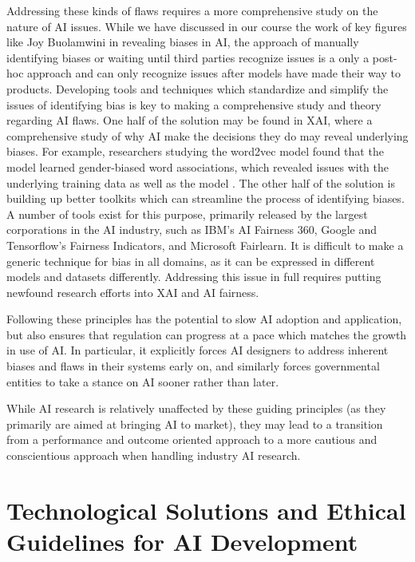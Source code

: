 \documentclass[10pt]{article}
\begin{document}
    Addressing these kinds of flaws requires a more comprehensive study on the nature of AI issues. While we have discussed in our course the work of key figures like Joy Buolamwini in revealing biases in AI, the approach of manually identifying biases or waiting until third parties recognize issues is a only a post-hoc approach and can only recognize issues after models have made their way to products. Developing tools and techniques which standardize and simplify the issues of identifying bias is key to making a comprehensive study and theory regarding AI flaws. One half of the solution may be found in XAI, where a comprehensive study of why AI make the decisions they do may reveal underlying biases. For example, researchers studying the word2vec model found that the model learned gender-biased word associations, which revealed issues with the underlying training data as well as the model \cite{bolukbasi2016man}. The other half of the solution is building up better toolkits which can streamline the process of identifying biases. A number of tools exist for this purpose, primarily released by the largest corporations in the AI industry, such as IBM’s AI Fairness 360, Google and Tensorflow’s Fairness Indicators, and Microsoft Fairlearn. It is difficult to make a generic technique for bias in all domains, as it can be expressed in different models and datasets differently. Addressing this issue in full requires putting newfound research efforts into XAI and AI fairness.

    Following these principles has the potential to slow AI adoption and application, but also ensures that regulation can progress at a pace which matches the growth in use of AI. In particular, it explicitly forces AI designers to address inherent biases and flaws in their systems early on, and similarly forces governmental entities to take a stance on AI sooner rather than later.

    While AI research is relatively unaffected by these guiding principles (as they primarily are aimed at bringing AI to market), they may lead to a transition from a performance and outcome oriented approach to a more cautious and conscientious approach when handling industry AI research.

\section{Technological Solutions and Ethical Guidelines for AI Development}
\end{document}
